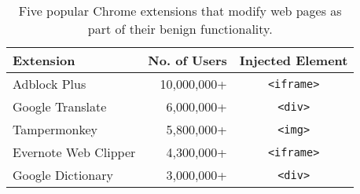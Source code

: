 \begin{table}[t]
    \centering
    \footnotesize
    \begin{tabular}{lrc}
    \toprule
    \textbf{Extension} & \textbf{No. of Users} & \textbf{Injected Element} \\
    \midrule
    Adblock Plus & 10,000,000+ & \texttt{\textless iframe\textgreater} \\
    Google Translate & 6,000,000+ & \texttt{\textless div\textgreater} \\
    Tampermonkey & 5,800,000+ & \texttt{\textless img\textgreater} \\
    Evernote Web Clipper & 4,300,000+ & \texttt{\textless iframe\textgreater} \\
    Google Dictionary & 3,000,000+ & \texttt{\textless div\textgreater} \\
    \bottomrule
    \end{tabular}
    \caption{Five popular Chrome extensions that modify web pages as part of their benign functionality.}
    \label{adinjection:tab:popular_extensions}
\end{table}
